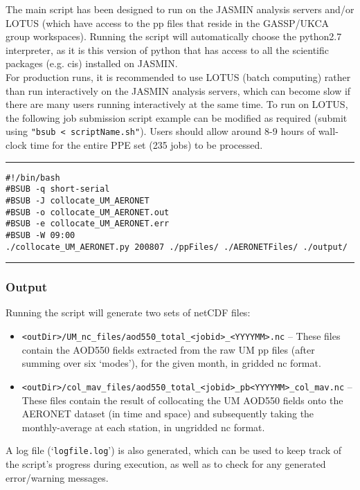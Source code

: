 \documentclass[10pt,a4paper]{article}
\begin{document}
\noindent The main script has been designed to run on the JASMIN analysis servers and/or LOTUS (which have access to the pp files that reside in the GASSP/UKCA group workspaces). Running the script will automatically choose the python2.7 interpreter, as it is this version of python that has access to all the scientific packages (e.g. cis) installed on JASMIN.\\

\noindent For production runs, it is recommended to use LOTUS (batch computing) rather than run interactively on the JASMIN analysis servers, which can become slow if there are many users running interactively at the same time. To run on LOTUS, the following job submission script example can be modified as required (submit using \texttt{"bsub < scriptName.sh"}). Users should allow around 8-9 hours of wall-clock time for the entire PPE set (235 jobs) to be processed.\\
\hrule
\begin{spacing}{1}
\begin{lstlisting}
#!/bin/bash
#BSUB -q short-serial
#BSUB -J collocate_UM_AERONET
#BSUB -o collocate_UM_AERONET.out 
#BSUB -e collocate_UM_AERONET.err 
#BSUB -W 09:00
./collocate_UM_AERONET.py 200807 ./ppFiles/ ./AERONETFiles/ ./output/
\end{lstlisting}
\end{spacing}
\hrule

\subsubsection{Output}
Running the script will generate two sets of netCDF files:
\begin{itemize}
\item \texttt{<outDir>/UM\_nc\_files/aod550\_total\_<jobid>\_<YYYYMM>.nc} -- These files contain the AOD550 fields extracted from the raw UM pp files (after summing over six `modes'), for the given month, in gridded nc format.
\item \texttt{<outDir>/col\_mav\_files/aod550\_total\_<jobid>\_pb<YYYYMM>\_col\_mav.nc} -- These files contain the result of collocating the UM AOD550 fields onto the AERONET dataset (in time and space) and subsequently taking the monthly-average at each station, in ungridded nc format.
\end{itemize}
A log file (`\texttt{logfile.log}') is also generated, which can be used to keep track of the script's progress during execution, as well as to check for any generated error/warning messages.
\end{document}
